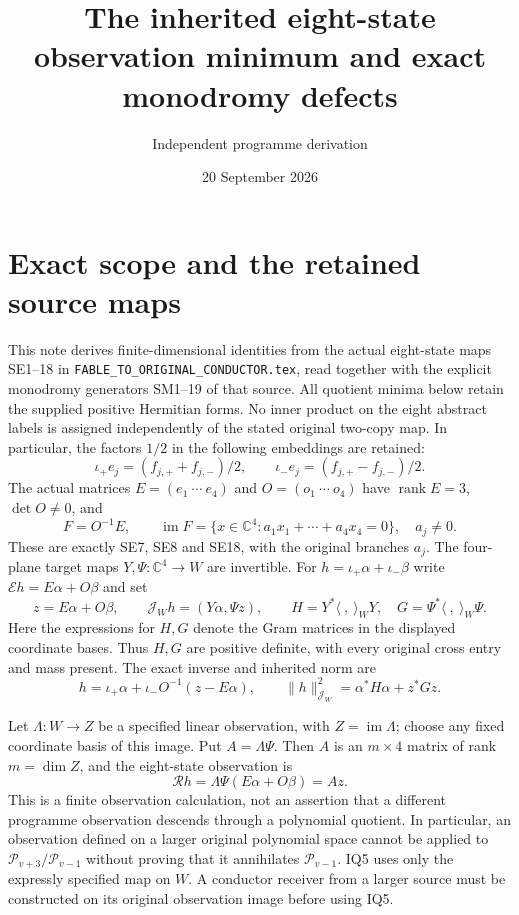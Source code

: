 \documentclass[11pt]{article}
\title{The inherited eight-state observation minimum and exact monodromy defects}
\author{Independent programme derivation}
\date{20 September 2026}
\newcommand{\C}{\mathbb C}
\newcommand{\im}{\operatorname{im}}
\newcommand{\rank}{\operatorname{rank}}
\begin{document}
\maketitle

\section{Exact scope and the retained source maps}
This note derives finite-dimensional identities from the actual eight-state
maps SE1--18 in \texttt{FABLE\_TO\_ORIGINAL\_CONDUCTOR.tex}, read together
with the explicit monodromy generators SM1--19 of that source.  All quotient
minima below retain the supplied positive Hermitian forms.  No inner product
on the eight abstract labels is assigned independently of the stated original
two-copy map.  In particular, the factors $1/2$ in the following embeddings
are retained:
\[
 \iota_+e_j=(f_{j,+}+f_{j,-})/2,\qquad
 \iota_-e_j=(f_{j,+}-f_{j,-})/2.                       \tag{IQ1}
\]
The actual matrices $E=(e_1\ \cdots\ e_4)$ and $O=(o_1\ \cdots\ o_4)$
have $\rank E=3$, $\det O\ne0$, and
\[
 F=O^{-1}E,\qquad
 \im F=\{x\in\C^4:a_1x_1+\cdots+a_4x_4=0\},\quad a_j\ne0. \tag{IQ2}
\]
These are exactly SE7, SE8 and SE18, with the original branches $a_j$.
The four-plane target maps $Y,\Psi:\C^4\longrightarrow W$ are invertible.
For $h=\iota_+\alpha+\iota_-\beta$ write
$\mathcal E h=E\alpha+O\beta$ and set
\[
 z=E\alpha+O\beta,\qquad
 \mathcal J_W h=(Y\alpha,\Psi z),\qquad
 H=Y^*\langle\ ,\ \rangle_WY,\quad
 G=\Psi^*\langle\ ,\ \rangle_W\Psi.                  \tag{IQ3}
\]
Here the expressions for $H,G$ denote the Gram matrices in the displayed
coordinate bases.  Thus $H,G$ are positive definite, with every original
cross entry and mass present.  The exact inverse and inherited norm are
\[
 h=\iota_+\alpha+\iota_-O^{-1}(z-E\alpha),\qquad
 \|h\|_{\mathcal J_W}^2=\alpha^*H\alpha+z^*Gz.         \tag{IQ4}
\]

Let $\Lambda:W\to Z$ be a specified linear observation, with $Z=\im\Lambda$;
choose any fixed coordinate basis of this image.  Put $A=\Lambda\Psi$.
Then $A$ is an $m\times4$ matrix of rank $m=\dim Z$, and the eight-state
observation is
\[
 \mathcal R h=\Lambda\Psi(E\alpha+O\beta)=Az.          \tag{IQ5}
\]
This is a finite observation calculation, not an assertion that a different
programme observation descends through a polynomial quotient.  In particular,
an observation defined on a larger original polynomial space cannot be applied
to $\mathcal P_{v+3}/\mathcal P_{v-1}$ without proving that it annihilates
$\mathcal P_{v-1}$.  IQ5 uses only the expressly specified map on $W$.  A
conductor receiver from a larger source must be constructed on its original
observation image before using IQ5.
\end{document}
